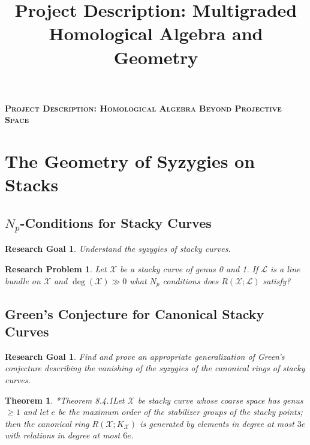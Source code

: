 \documentclass[11pt,reqno]{amsart}
\title{Project Description: Multigraded Homological Algebra and Geometry}
\newtheorem{theorem}[lemma]{Theorem}
\newtheorem{goal}[lemma]{Research Goal}
\newtheorem{problem}[lemma]{Research Problem}
\theoremstyle{remark}
\newcommand{\cL}{\mathcal{L}}
\newcommand{\cX}{\mathcal{X}}
\begin{document}
 

\thispagestyle{empty}
\pagestyle{empty}
\begingroup  
  \centering
  \large\scshape\bfseries Project Description: Homological Algebra Beyond Projective Space\\[1em]
\endgroup

\section{The Geometry of Syzygies on Stacks}


\subsection{$N_{p}$-Conditions for Stacky Curves}

\begin{goal}
	Understand the syzygies of stacky curves.
\end{goal}

\begin{problem}
	Let $\cX$ be a stacky curve of genus 0 and 1. If $\cL$ is a line bundle on $\cX$ and $\deg(\cX)\gg0$ what $N_{p}$ conditions does $R(\cX; \cL)$ satisfy?
\end{problem}



\subsection{Green's Conjecture for Canonical Stacky Curves} 

\begin{goal}\label{goal:stackyGreens}
Find and prove an appropriate generalization of Green's conjecture describing the vanishing of the syzygies of the canonical rings of stacky curves. 
\end{goal}

\begin{theorem}\cite{voightZurieckBrown22}*{Theorem 8.4.1}\label{thm:voight-dzb}
Let $\cX$ be stacky curve whose coarse space has genus $\geq 1$ and let $e$ be the maximum order of the stabilizer groups of the stacky points; then the canonical ring $R(\cX; K_{\cX})$ is  generated by elements in degree at most $3e$ with relations in degree at most $6e$. %
\end{theorem}
\end{document}
